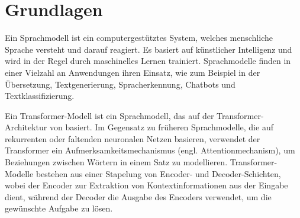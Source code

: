 \chapter{Grundlagen}\label{ch:preliminaries}

\begin{definition}[Sprachmodell]\label{def:sprachmodell}
    Ein Sprachmodell ist ein computergestütztes System, welches menschliche Sprache versteht und darauf reagiert.
    Es basiert auf künstlicher Intelligenz und wird in der Regel durch maschinelles Lernen trainiert.
    Sprachmodelle finden in einer Vielzahl an Anwendungen ihren Einsatz, wie zum Beispiel in der Übersetzung,
    Textgenerierung, Spracherkennung, Chatbots und Textklassifizierung.
\end{definition}

\begin{definition}\label{def:transformer-modell}
    Ein Transformer-Modell ist ein Sprachmodell, das auf der Transformer-Architektur von \citet{attention} basiert.
    Im Gegensatz zu früheren Sprachmodelle, die auf rekurrenten oder faltenden neuronalen Netzen basieren,
    verwendet der Transformer ein Aufmerksamkeitsmechanismus (engl. Attentionmechanism), um Beziehungen zwischen Wörtern in einem Satz zu modellieren.
    Transformer-Modelle bestehen aus einer Stapelung von Encoder- und Decoder-Schichten, wobei der Encoder zur Extraktion von Kontextinformationen aus der Eingabe dient,
    während der Decoder die Ausgabe des Encoders verwendet, um die gewünschte Aufgabe zu lösen.
\end{definition}

